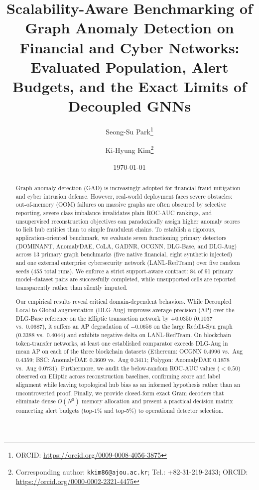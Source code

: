 \documentclass[11pt,a4paper]{article}
\title{\textbf{\Large Scalability-Aware Benchmarking of Graph Anomaly Detection on Financial and Cyber Networks: Evaluated Population, Alert Budgets, and the Exact Limits of Decoupled GNNs}}
\author[1]{Seong-Su Park\thanks{ORCID: \url{https://orcid.org/0009-0008-4056-3875}}}
\author[2]{Ki-Hyung Kim\thanks{Corresponding author: \texttt{kkim86@ajou.ac.kr}; Tel.: +82-31-219-2433; ORCID: \url{https://orcid.org/0000-0002-2321-4475}}}
\affil[1]{\small Department of Computer Engineering, Ajou University, Suwon 16499, Republic of Korea; \texttt{parky@ajou.ac.kr}}
\affil[2]{\small Department of Cyber Security, Ajou University, Suwon 16499, Republic of Korea; \texttt{kkim86@ajou.ac.kr}}
\date{\today}
\begin{document}
\maketitle

\begin{abstract}
Graph anomaly detection (GAD) is increasingly adopted for financial fraud mitigation and cyber intrusion defense. However, real-world deployment faces severe obstacles: out-of-memory (OOM) failures on massive graphs are often obscured by selective reporting, severe class imbalance invalidates plain ROC-AUC rankings, and unsupervised reconstruction objectives can paradoxically assign higher anomaly scores to licit hub entities than to simple fraudulent chains. To establish a rigorous, application-oriented benchmark, we evaluate seven functioning primary detectors (DOMINANT, AnomalyDAE, CoLA, GADNR, OCGNN, DLG-Base, and DLG-Aug) across 13 primary graph benchmarks (five native financial, eight synthetic injected) and one external enterprise cybersecurity network (LANL-RedTeam) over five random seeds (455 total runs). We enforce a strict support-aware contract: 84 of 91 primary model--dataset pairs are successfully completed, while unsupported cells are reported transparently rather than silently imputed. 

Our empirical results reveal critical domain-dependent behaviors. While Decoupled Local-to-Global augmentation (DLG-Aug) improves average precision (AP) over the DLG-Base reference on the Elliptic transaction network by $+0.0350$ (0.1037 vs.\ 0.0687), it suffers an AP degradation of $-0.0656$ on the large Reddit-Syn graph (0.3388 vs.\ 0.4044) and exhibits negative delta on LANL-RedTeam. On blockchain token-transfer networks, at least one established comparator exceeds DLG-Aug in mean AP on each of the three blockchain datasets (Ethereum: OCGNN $0.4996$ vs.\ Aug $0.4359$; BSC: AnomalyDAE $0.3609$ vs.\ Aug $0.3411$; Polygon: AnomalyDAE $0.1878$ vs.\ Aug $0.0731$). Furthermore, we audit the below-random ROC-AUC values ($<0.50$) observed on Elliptic across reconstruction baselines, confirming score and label alignment while leaving topological hub bias as an informed hypothesis rather than an uncontroverted proof. Finally, we provide closed-form exact Gram decoders that eliminate dense $O(N^2)$ memory allocation and present a practical decision matrix connecting alert budgets (top-1\% and top-5\%) to operational detector selection.
\end{abstract}

\par
\end{document}

